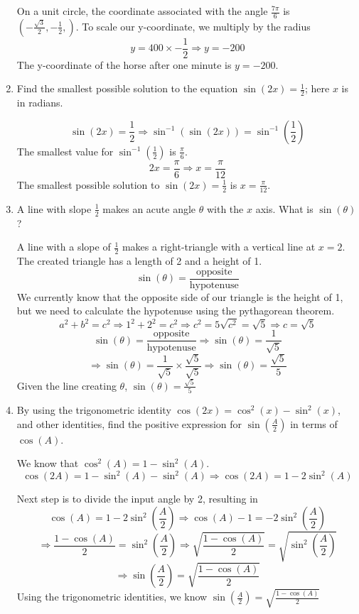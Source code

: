 \documentclass{article}
\begin{document}
\begin{enumerate}
On a unit circle, the coordinate associated with the angle $\frac{7\pi}{6}$
is \\$\left(-\frac{\sqrt{3}}{2},-\frac{1}{2},\right)$.
To scale our y-coordinate, we multiply by the radius
\[y = 400 \times -\frac{1}{2} \Longrightarrow y = -200\]
The y-coordinate of the horse after one minute is $y = -200$.\

\pagebreak
\item Find the smallest possible solution to the equation $\sin(2x) = \frac{1}{2}$;
here $x$ is in radians.

\[\sin(2x) = \frac{1}{2} \Longrightarrow \sin^{-1}(\sin(2x)) = \sin^{-1}\left(\frac{1}{2}\right)\]
The smallest value for $\sin^{-1}\left(\frac{1}{2}\right)$ is $\frac{\pi}{6}$.
\[2x = \frac{\pi}{6} \Longrightarrow x = \frac{\pi}{12}\]
The smallest possible solution to $\sin(2x) = \frac{1}{2}$ is $x = \frac{\pi}{12}$.

\item A line with slope $\frac{1}{2}$ makes an acute angle $\theta$ with the $x$ axis.
What is $\sin(\theta)$?

A line with a slope of $\frac{1}{2}$ makes a right-triangle with a vertical line at $x = 2$.
The created triangle has a length of 2 and a height of 1.
\[\sin(\theta) = \frac{\text{opposite}}{\text{hypotenuse}}\]
We currently know that the opposite side of our triangle is the height of 1, but we need
to calculate the hypotenuse using the pythagorean theorem.
\[a^{2} + b^{2} = c^{2} \Longrightarrow 1^{2} + 2^{2} = c^{2} \Longrightarrow c^{2} = 5
    \sqrt{c^{2}} = \sqrt{5} \Longrightarrow c = \sqrt{5}\]
\[\sin(\theta) = \frac{\text{opposite}}{\text{hypotenuse}}
    \Longrightarrow \sin(\theta) = \frac{1}{\sqrt{5}}\]
\[\Longrightarrow \sin(\theta) = \frac{1}{\sqrt{5}}\times\frac{\sqrt{5}}{\sqrt{5}}
    \Longrightarrow \sin(\theta) = \frac{\sqrt{5}}{5}\]
Given the line creating $\theta$, $\sin(\theta) = \frac{\sqrt{5}}{5}$

\item By using the trigonometric identity $\cos(2x) = \cos^{2}(x) - \sin^{2}(x)$, and
other identities, find the positive expression for $\sin\left(\frac{A}{2}\right)$ in
terms of $\cos(A)$.

We know that $\cos^{2}(A) = 1 - \sin^{2}(A)$.
\[\cos(2A) = 1 - \sin^{2}(A) - \sin^{2}(A) \Longrightarrow \cos(2A) = 1 - 2\sin^{2}(A)\]

Next step is to divide the input angle by 2, resulting in
\[\cos(A) = 1 - 2\sin^{2}\left(\frac{A}{2}\right)
    \Longrightarrow \cos(A) - 1 = - 2\sin^{2}\left(\frac{A}{2}\right)\]
\[\Longrightarrow \frac{1 - \cos(A)}{2} = \sin^{2}\left(\frac{A}{2}\right)
    \Longrightarrow \sqrt{\frac{1 - \cos(A)}{2}} = \sqrt{\sin^{2}\left(\frac{A}{2}\right)}\]
\[\Longrightarrow \sin\left(\frac{A}{2}\right) = \sqrt{\frac{1 - \cos(A)}{2}}\]
Using the trigonometric identities, we know $\sin\left(\frac{A}{2}\right) = \sqrt{\frac{1 - \cos(A)}{2}}$


\end{enumerate}
\end{document}
